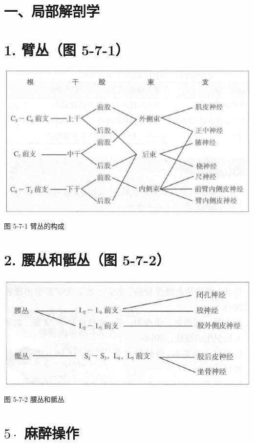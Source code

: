 \documentclass[10pt]{article}
\begin{document}
\section*{一、局部解剖学}
\section*{1. 臂丛（图 5-7-1）}
\begin{center}
\includegraphics[max width=\textwidth]{2024_07_05_645bb794a4d4f32ee0c8g-316(2)}
\end{center}

图 5-7-1 臂丛的构成

\section*{2. 腰丛和骶丛（图 5-7-2）}
\begin{center}
\includegraphics[max width=\textwidth]{2024_07_05_645bb794a4d4f32ee0c8g-316(1)}
\end{center}

图 5-7-2 腰丛和骶丛

\section*{$5 \cdot$ 麻醉操作}
\end{document}
